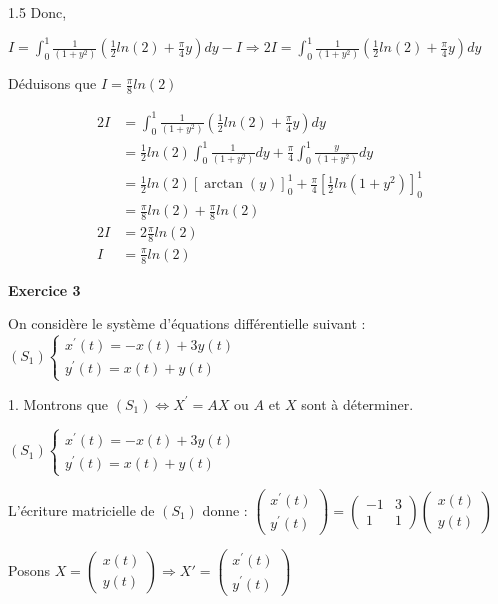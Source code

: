 \documentclass[12pt]{article}
\begin{document}
\begin{spacing}{1.5}
Donc,

$I=\int_{0}^{1}\frac{1}{(1+y^2)}(\frac{1}{2}ln(2)+\frac{\pi}{4}y)dy-I\Rightarrow 2I=\int_{0}^{1}\frac{1}{(1+y^2)}(\frac{1}{2}ln(2)+\frac{\pi}{4}y)dy$

Déduisons que $I=\frac{\pi}{8}ln(2)$

\begin{align*}
2I &=\int_{0}^{1}\frac{1}{(1+y^2)}(\frac{1}{2}ln(2)+\frac{\pi}{4}y)dy\\
&=\frac{1}{2}ln(2)\int_{0}^{1}\frac{1}{(1+y^2)}dy+\frac{\pi}{4}\int_{0}^{1}\frac{y}{(1+y^2)}dy\\
&=\frac{1}{2}ln(2)[\arctan(y)]_0^1+\frac{\pi}{4}[\frac{1}{2}ln(1+y^2)]_0^1\\
&=\frac{\pi}{8}ln(2)+\frac{\pi}{8}ln(2)\\
2I &=2\frac{\pi}{8}ln(2)\\
I&=\frac{\pi}{8}ln(2)
\end{align*}


\medskip
\textbf{Exercice 3}


On considère le système d'équations différentielle suivant :  $(S_1)\begin{cases}
x^{\prime}(t)=-x(t) + 3 y(t)\\
y^{\prime}(t)=x(t) + y(t)
\end{cases}$

1. Montrons que $(S_1)\Longleftrightarrow X^{\prime} = AX$ ou $A$ et $X$ sont à déterminer.

$(S_1)\begin{cases}
x^{\prime}(t)=-x(t) + 3 y(t)\\
y^{\prime}(t)=x(t) + y(t)
\end{cases}$

L'écriture matricielle de $(S_1)$ donne : $\begin{pmatrix}
x^{\prime}(t)\\
y^{\prime}(t)
\end{pmatrix}=\begin{pmatrix}
-1 & 3 \\
1 & 1
\end{pmatrix}\begin{pmatrix}
x(t)\\
y(t)
\end{pmatrix}$

Posons $X=\begin{pmatrix}
x(t)\\
y(t)
\end{pmatrix}\Rightarrow X'=\begin{pmatrix}
x^{\prime}(t)\\
y^{\prime}(t)
\end{pmatrix}$


\end{spacing}
\end{document}
